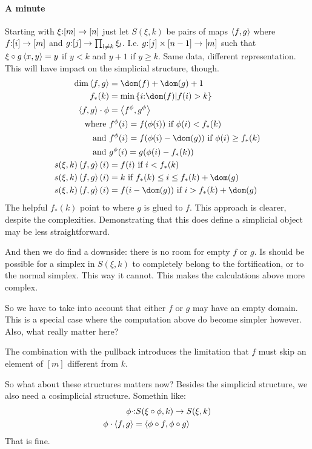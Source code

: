 \documentclass[csh.tex]{subfiles}
\begin{document}
\paragraph{A minute}
Starting with $\xi\mathord :[m]\to[n]$ just let $S(\xi,k)$ be pairs of maps $\left\langle f,g \right\rangle$ where $f\mathord : [i]\to[m]$ and $g\mathord : [j] \to \prod_{l\neq k} \xi_l$. I.e. $g\mathord :[j]\times[n-1] \to [m]$ such that $\xi \circ g\left\langle x,y \right\rangle = y$ if $y < k$ and $y+1$ if $y \geq k$.
Same data, different representation. This will have impact on the simplicial structure, though.
\begin{align*}
\dim\tuplet{f,g}&=\dom(f) + \dom(g) + 1\\
f_*(k) &= \min\set{i\of\dom(f) | f(i) > k}\\ %
\tuplet{f,g}\cdot\phi &= \tuplet{f^\phi,g^\phi}\\
\textrm{where } &f^\phi(i) = f(\phi(i)) \textrm{ if } \phi(i) < f_*(k) \\
\textrm{and } &f^\phi(i) = f(\phi(i)-\dom(g)) \textrm{ if } \phi(i) \geq f_*(k) \\
\textrm{and } &g^\phi(i) = g(\phi(i)-f_*(k)) \\
s(\xi,k)\tuplet{f,g}(i) &= f(i) \textrm{ if } i < f_*(k)\\
s(\xi,k)\tuplet{f,g}(i) &= k \textrm{ if } f_*(k) \leq i \leq f_*(k) + \dom(g)\\
s(\xi,k)\tuplet{f,g}(i) &= f(i-\dom(g)) \textrm{ if } i > f_*(k) + \dom(g)
\end{align*}
The helpful $f_*(k)$ point to where $g$ is glued to $f$.
This approach is clearer, despite the complexities. Demonstrating that this does define a simplicial object may be less straightforward.

And then we do find a downside: there is no room for empty $f$ or $g$. Is should be possible for a simplex in $S(\xi,k)$ to completely belong to the fortification, or to the normal simplex. This way it cannot. This makes the calculations above more complex.

So we have to take into account that either $f$ or $g$ may have an empty domain. This is a special case where the computation above do become simpler however. Also, what really matter here?

The combination with the pullback introduces the limitation that $f$ must skip an element of $[m]$ different from $k$.

So what about these structures matters now?
Besides the simplicial structure, we also need a cosimplicial structure. Somethin like:
\begin{align*}
\phi \cdot  &\mathord : S(\xi\circ \phi,k) \to S(\xi,k)\\
\phi \cdot\left\langle f,g \right\rangle &= \left\langle \phi\circ f,\phi\circ g \right\rangle
\end{align*} 
That is fine.
\end{document}
